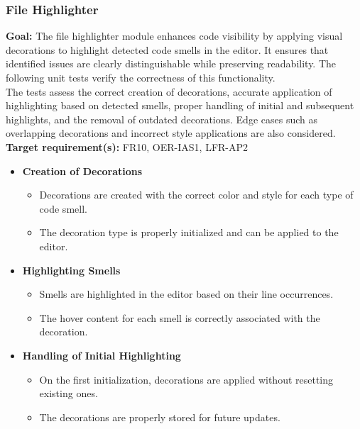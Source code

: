 \documentclass[12pt, titlepage]{article}
\begin{document}
\begin{enumerate}[label={\bf \textcolor{Maroon}{test-SRT-\arabic*}}, wide=0pt, font=\itshape]
\subsubsection{File Highlighter}

\textbf{Goal:} The file highlighter module enhances code visibility by applying visual decorations to highlight detected code smells in the editor. It ensures that identified issues are clearly distinguishable while preserving readability. The following unit tests verify the correctness of this functionality.\\

\noindent The tests assess the correct creation of decorations, accurate application of highlighting based on detected smells, proper handling of initial and subsequent highlights, and the removal of outdated decorations. Edge cases such as overlapping decorations and incorrect style applications are also considered.\\

\noindent\textbf{Target requirement(s):} FR10, OER-IAS1, LFR-AP2~\cite{SRS} \\

\begin{itemize}
    \item \textbf{Creation of Decorations}
    \begin{itemize}
        \item Decorations are created with the correct color and style for each type of code smell.
        \item The decoration type is properly initialized and can be applied to the editor.
    \end{itemize}

    \item \textbf{Highlighting Smells}
    \begin{itemize}
        \item Smells are highlighted in the editor based on their line occurrences.
        \item The hover content for each smell is correctly associated with the decoration.
    \end{itemize}

    \item \textbf{Handling of Initial Highlighting}
    \begin{itemize}
        \item On the first initialization, decorations are applied without resetting existing ones.
        \item The decorations are properly stored for future updates.
    \end{itemize}


\end{itemize}
\end{enumerate}
\end{document}
